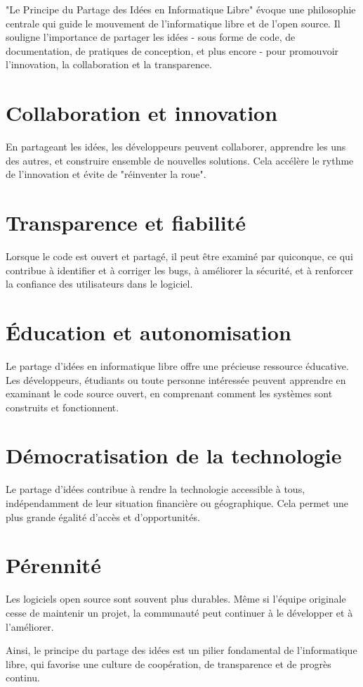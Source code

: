 "Le Principe du Partage des Idées en Informatique Libre" évoque une philosophie centrale qui guide le mouvement de l'informatique libre et de l'open source. Il souligne l'importance de partager les idées - sous forme de code, de documentation, de pratiques de conception, et plus encore - pour promouvoir l'innovation, la collaboration et la transparence.\\

\section{Collaboration et innovation} 
En partageant les idées, les développeurs peuvent collaborer, apprendre les uns des autres, et construire ensemble de nouvelles solutions. Cela accélère le rythme de l'innovation et évite de "réinventer la roue".

\section{Transparence et fiabilité} 
Lorsque le code est ouvert et partagé, il peut être examiné par quiconque, ce qui contribue à identifier et à corriger les bugs, à améliorer la sécurité, et à renforcer la confiance des utilisateurs dans le logiciel.

\section{Éducation et autonomisation}
Le partage d'idées en informatique libre offre une précieuse ressource éducative. Les développeurs, étudiants ou toute personne intéressée peuvent apprendre en examinant le code source ouvert, en comprenant comment les systèmes sont construits et fonctionnent.

\section{Démocratisation de la technologie}
Le partage d'idées contribue à rendre la technologie accessible à tous, indépendamment de leur situation financière ou géographique. Cela permet une plus grande égalité d'accès et d'opportunités.

\section{Pérennité} 
Les logiciels open source sont souvent plus durables. Même si l'équipe originale cesse de maintenir un projet, la communauté peut continuer à le développer et à l'améliorer.




Ainsi, le principe du partage des idées est un pilier fondamental de l'informatique libre, qui favorise une culture de coopération, de transparence et de progrès continu.
